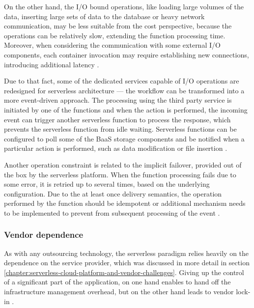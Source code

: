 On the other hand, the I/O bound operations, like loading large volumes of the data, inserting large sets of data to the database or heavy network communication, may be less suitable from the cost perspective, because the operations can be relatively slow, extending the function processing time. Moreover, when considering the communication with some external I/O components, each container invocation may require establishing new connections, introducing additional latency \cite{LeveragingServerlessCloudComputingArchitectures}.

Due to that fact, some of the dedicated services capable of I/O operations are redesigned for serverless architecture --- the workflow can be transformed into a more event-driven approach. The processing using the third party service is initiated by one of the functions and when the action is performed, the incoming event can trigger another serverless function to process the response, which prevents the serverless function from idle waiting. Serverless functions can be configured to poll some of the BaaS storage components and be notified when a particular action is performed, such as data modification or file insertion \cite{EvaluationOfServerlessApplicationProgrammingModel}.

Another operation constraint is related to the implicit failover, provided out of the box by the serverless platform. When the function processing fails due to some error, it is retried up to several times, based on the underlying configuration. Due to the at least once delivery semantics, the operation performed by the function should be idempotent or additional mechanism needs to be implemented to prevent from subsequent processing of the event \cite{EvaluationOfServerlessApplicationProgrammingModel}.

\subsubsection{Vendor dependence} \label{chapter:serverless-suitability-vendor-dependence}

As with any outsourcing technology, the serverless paradigm relies heavily on the dependence on the service provider, which was discussed in more detail in section \ref{chapter:serverless-cloud-platform-and-vendor-challenges}.
Giving up the control of a significant part of the application, on one hand enables to hand off the infrastructure management overhead, but on the other hand leads to vendor lock-in \cite{MartinFowlerServerless}.

